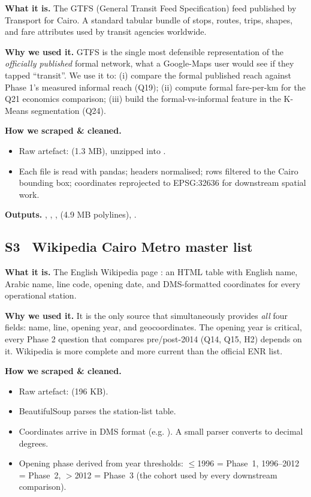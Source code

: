 \textbf{What it is.} The GTFS (General Transit Feed Specification) feed
published by Transport for Cairo. A standard tabular bundle of stops,
routes, trips, shapes, and fare attributes used by transit agencies
worldwide.

\textbf{Why we used it.} GTFS is the single most defensible
representation of the \emph{officially published} formal network, what
a Google-Maps user would see if they tapped ``transit''. We use it to:
(i) compare the formal published reach against Phase 1's measured
informal reach (Q19); (ii) compute formal fare-per-km for the
Q21 economics comparison; (iii) build the formal-vs-informal feature
in the K-Means segmentation (Q24).

\textbf{How we scraped \& cleaned.}
\begin{itemize}
 \item Raw artefact:  (1.3 MB), 
 unzipped into .
 \item Each  file is read with pandas; headers normalised;
 rows filtered to the Cairo bounding box; coordinates reprojected
 to EPSG:32636 for downstream spatial work.
\end{itemize}

\textbf{Outputs.} , ,
,  (4.9 MB polylines),
.

\subsection{S3 \textbullet\ Wikipedia Cairo Metro master list}

\textbf{What it is.} The English Wikipedia page
: an HTML table with English
name, Arabic name, line code, opening date, and DMS-formatted
coordinates for every operational station.

\textbf{Why we used it.} It is the only source that simultaneously
provides \emph{all} four fields: name, line, opening year, and
geocoordinates. The opening year is critical, every Phase 2 question
that compares pre/post-2014 (Q14, Q15, H2) depends on it. Wikipedia
is more complete and more current than the official ENR list.

\textbf{How we scraped \& cleaned.}
\begin{itemize}
 \item Raw artefact:  (196 KB).
 \item BeautifulSoup parses the station-list table.
 \item Coordinates arrive in DMS format (e.g. ). A small parser converts to decimal degrees.
 \item Opening phase derived from year thresholds:
 $\le$1996 = Phase~1, 1996--2012 = Phase~2,
 $>$2012 = Phase~3 (the  cohort used by every
 downstream comparison).
\end{itemize}

